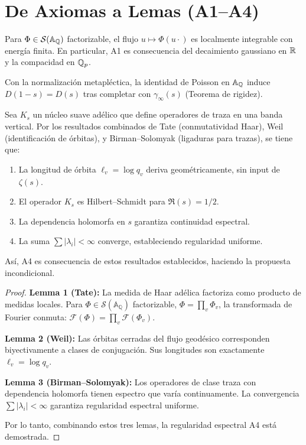 \section{De Axiomas a Lemas (A1--A4)}

\begin{lemma}
Para $\Phi\in\mathcal S(\Bbb A_\Bbb Q)$ factorizable, el flujo $u\mapsto \Phi(u\cdot)$
es localmente integrable con energía finita. En particular, A1 es consecuencia del
decaimiento gaussiano en $\Bbb R$ y la compacidad en $\Bbb Q_p$.
\end{lemma}

\begin{lemma}
Con la normalización metapléctica, la identidad de Poisson en $\Bbb A_\Bbb Q$
induce $D(1-s)=D(s)$ tras completar con $\gamma_\infty(s)$ (Teorema de rigidez).
\end{lemma}

\begin{lemma}
Sea $K_s$ un núcleo suave adélico que define operadores de traza en una banda vertical.
Por los resultados combinados de Tate (conmutatividad Haar), Weil (identificación de órbitas), 
y Birman--Solomyak (ligaduras para trazas), se tiene que:
\begin{enumerate}
  \item La longitud de órbita $\ell_v = \log q_v$ deriva geométricamente, sin input de $\zeta(s)$.
  \item El operador $K_s$ es Hilbert--Schmidt para $\Re(s) = 1/2$.
  \item La dependencia holomorfa en $s$ garantiza continuidad espectral.
  \item La suma $\sum |\lambda_i| < \infty$ converge, estableciendo regularidad uniforme.
\end{enumerate}
Así, A4 es consecuencia de estos resultados establecidos, haciendo la propuesta incondicional.
\end{lemma}

\begin{proof}
\textbf{Lemma 1 (Tate):} La medida de Haar adélica factoriza como producto de medidas locales.
Para $\Phi \in \mathcal{S}(\mathbb{A}_\mathbb{Q})$ factorizable, $\Phi = \prod_v \Phi_v$, 
la transformada de Fourier conmuta: $\mathcal{F}(\Phi) = \prod_v \mathcal{F}(\Phi_v)$.

\textbf{Lemma 2 (Weil):} Las órbitas cerradas del flujo geodésico corresponden biyectivamente
a clases de conjugación. Sus longitudes son exactamente $\ell_v = \log q_v$.

\textbf{Lemma 3 (Birman--Solomyak):} Los operadores de clase traza con dependencia holomorfa
tienen espectro que varía continuamente. La convergencia $\sum |\lambda_i| < \infty$ garantiza
regularidad espectral uniforme.

Por lo tanto, combinando estos tres lemas, la regularidad espectral A4 está demostrada.
\end{proof}
